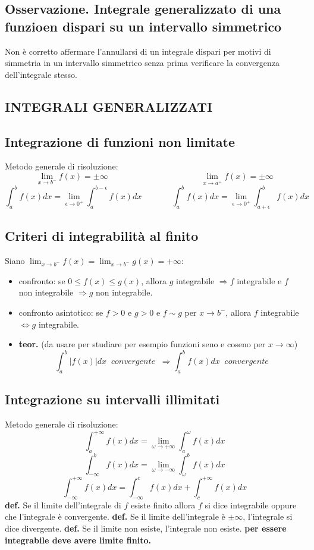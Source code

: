 \documentclass[a4paper, 9pt]{report}
\begin{document}
\subsection*{Osservazione. Integrale generalizzato di una funzioen dispari su un intervallo simmetrico}
Non è corretto affermare l'annullarsi di un integrale dispari per motivi di simmetria in un intervallo simmetrico senza prima verificare la convergenza dell'integrale stesso.
\subsection*{INTEGRALI GENERALIZZATI}
\subsection*{Integrazione di funzioni non limitate}
Metodo generale di risoluzione:
\[
    \lim_{x\rightarrow b^-} f(x) = \pm \infty \;\;\;\;\;\;\;\;\;\;\;\;\;\;\;\;\;\;\;\;\;\;\;\;\;\;\;\;\;\;\;\;\;\;\;\;\;\;\;\;\lim_{x\rightarrow a^+}f(x) = \pm \infty
\]
\[
    \int_{a}^{b}f(x)dx = \lim_{\epsilon\rightarrow 0^+}\int_{a}^{b-\epsilon}f(x)dx \;\;\;\;\;\;\;\;\;\;\;\;\; \int_{a}^{b}f(x)dx = \lim_{\epsilon\rightarrow 0^+}\int_{a+\epsilon}^{b}f(x)dx 
\]
\subsection*{Criteri di integrabilità al finito}
Siano $\lim_{x\rightarrow b^-}f(x) = \lim_{x\rightarrow b^-}g(x) = + \infty$:
\begin{itemize}
    \item confronto: se $0\leq f(x) \leq g(x)$, allora $g$ integrabile $\Rightarrow f$ integrabile e $f$ non integrabile $\Rightarrow g$ non integrabile.
    \item confronto asintotico: se $f>0$ e $g>0$ e $f \sim g$ per $x \rightarrow b^-$, allora $f$ integrabile $\Leftrightarrow g$ integrabile.
    \item \textbf{teor.} (da usare per studiare per esempio funzioni seno e coseno per $x \rightarrow \infty$)
    \[
        \int_{a}^{b}|f(x)|dx \;\; convergente \;\;\Rightarrow \int_{a}^{b}f(x)dx \;\;convergente
    \]
\end{itemize}
\subsection*{Integrazione su intervalli illimitati}
Metodo generale di risoluzione:
\[
    \int_{a}^{+\infty}f(x) dx = \lim_{\omega\rightarrow +\infty}\int_{a}^{\omega}f(x)dx
\]
\[
    \int_{- \infty}^{b}f(x) dx = \lim_{\omega\rightarrow -\infty}\int_{\omega}^{b}f(x)dx
\]
\[
    \int_{-\infty}^{+\infty}f(x) dx = \int_{-\infty}^{c} f(x) dx + \int_{c}^{+\infty}f(x) dx
\]
\textbf{def.} Se il limite dell'integrale di $f$ esiste finito allora $f$ si dice integrabile oppure che l'integrale è convergente. \newline
\textbf{def.} Se il limite dell'integrale è $\pm \infty$, l'integrale si dice divergente.\newline
\textbf{def.} Se il limite non esiste, l'integrale non esiste.\newline
\textbf{per essere integrabile deve avere limite finito.}
\end{document}
